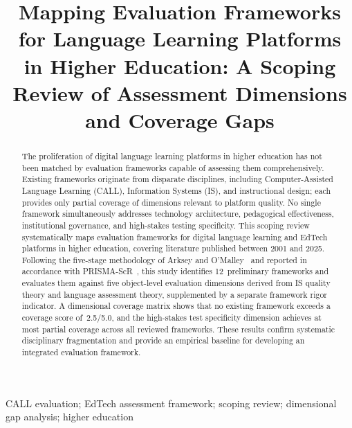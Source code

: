 \documentclass[conference]{IEEEtran}
\begin{document}
\title{Mapping Evaluation Frameworks for Language Learning
       Platforms in Higher Education: A Scoping Review of
       Assessment Dimensions and Coverage Gaps}

\author{%
}

\maketitle

\begin{abstract}
The proliferation of digital language learning platforms in higher
education has not been matched by evaluation frameworks capable of
assessing them comprehensively. Existing frameworks originate from
disparate disciplines, including Computer-Assisted Language Learning
(CALL), Information Systems (IS), and instructional design; each
provides only partial coverage of dimensions relevant to platform
quality. No single framework simultaneously addresses technology
architecture, pedagogical effectiveness, institutional governance,
and high-stakes testing specificity. This scoping review
systematically maps evaluation frameworks for digital language
learning and EdTech platforms in higher education, covering
literature published between 2001 and 2025. Following the five-stage
methodology of Arksey and O'Malley~\cite{b6} and reported in
accordance with PRISMA-ScR~\cite{b11}, this study identifies
12~preliminary frameworks and evaluates them against five object-level
evaluation dimensions derived from IS quality theory and language
assessment theory, supplemented by a separate framework rigor
indicator. A dimensional coverage matrix shows that no existing
framework exceeds a coverage score of~2.5/5.0, and the high-stakes
test specificity dimension achieves at most partial coverage across
all reviewed frameworks. These results confirm systematic disciplinary
fragmentation and provide an empirical baseline for developing an
integrated evaluation framework.
\end{abstract}

\begin{IEEEkeywords}
CALL evaluation; EdTech assessment framework; scoping review;
dimensional gap analysis; higher education
\end{IEEEkeywords}
\end{document}
